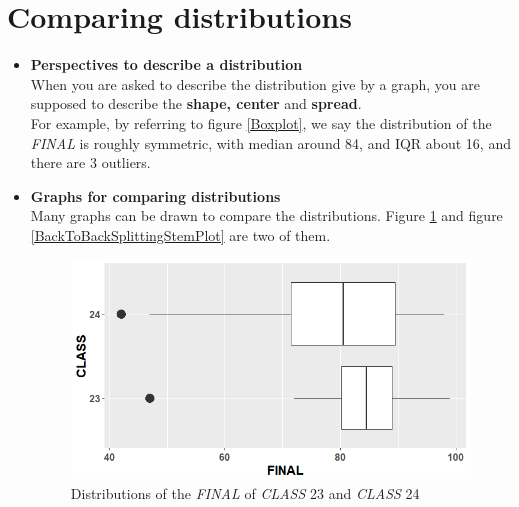 \documentclass[a4paper, 12pt,twoside]{book}
\begin{document}
\section{Comparing distributions}
\begin{itemize}
\item \textbf{Perspectives to describe a distribution}\vspace{0.3cm}\\
When you are asked to describe the distribution give by a graph, you are supposed to describe the \textbf{shape, center} and \textbf{spread}. \vspace{0.3cm}\\
For example, by referring to figure \ref{Boxplot}, we say the distribution of the \textit{FINAL} is roughly symmetric, with median around 84, and IQR about 16, and there are 3 outliers.

\item \textbf{Graphs for comparing distributions}\vspace{0.3cm}\\
Many graphs can be drawn to compare the distributions. Figure \ref{BxoplotComparison} and figure \ref{BackToBackSplittingStemPlot} are two of them.
\begin{figure}[H]
\centering
\includegraphics[scale=0.5]{BxoplotComparison.png}
\caption{Distributions of the \textit{FINAL} of \textit{CLASS} 23 and \textit{CLASS} 24}
\label{BxoplotComparison}
\end{figure}


\end{itemize}
\end{document}
